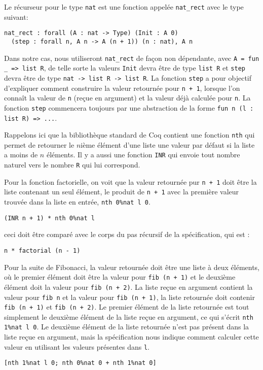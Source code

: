 \documentclass[draft]{jflart}
\begin{document}
Le récurseur pour le type \texttt{nat} est une fonction appelée
\texttt{nat\_rect} avec le type suivant:
\begin{verbatim}
nat_rect : forall (A : nat -> Type) (Init : A 0)
  (step : forall n, A n -> A (n + 1)) (n : nat), A n
\end{verbatim}
Dans notre cas, nous utiliseront \texttt{nat\_rect} de façon non
dépendante, avec \texttt{A = fun \_ => list R}, de telle sorte la
valeurs \texttt{Init} devra être de type \texttt{list R} et \texttt{step} devra
être de type \texttt{nat -> list R -> list R}.  La fonction \texttt{step} a
pour objectif d'expliquer comment construire la valeur retournée pour
\texttt{n + 1}, lorsque l'on connaît la valeur de \texttt{n} (reçue en argument)
et la valeur déjà calculée pour \texttt{n}.  La fonction \texttt{step} commencera
toujours par une abstraction de la forme \texttt{fun n (l : list R) => ...}.

Rappelons ici que la bibliothèque standard de Coq contient une
fonction \texttt{nth} qui permet de retourner le \(n\)ième élément d'une
liste une valeur par défaut si la liste a moins de \(n\) éléments.  Il
y a aussi une fonction \texttt{INR} qui envoie tout nombre naturel vers
le nombre \texttt{R} qui lui correspond.

Pour la fonction factorielle, on voit que la valeur retournée pur
\texttt{n + 1} doit être la liste contenant un seul élément,
le produit de \texttt{n + 1} avec
la première valeur trouvée dans la liste en entrée, \texttt{nth 0\%nat l 0}.
\begin{verbatim}
(INR n + 1) * nth 0%nat l
\end{verbatim}
ceci doit être comparé avec le corps du pas récursif de la
spécification, qui est :
\begin{verbatim}
n * factorial (n - 1)
\end{verbatim}

Pour la suite de Fibonacci, la valeur retournée doit être une liste à
deux éléments, où le premier élément doit être la valeur pour \texttt{fib
  (n + 1)} et le deuxième élément doit la valeur pour \texttt{fib (n +
    2)}.  La liste reçue en argument contient la valeur pour \texttt{fib
    n} et la valeur pour \texttt{fib (n + 1)}, la liste retournée doit
contenir \texttt{fib (n + 1)} et \texttt{fib (n + 2)}.  Le premier
élément de la liste retournée est tout simplement le deuxième élément
de la liste reçue en argument, ce qui s'écrit \texttt{nth 1\%nat l 0}.
Le deuxième élément de la liste retournée n'est pas présent dans la
liste reçue en argument, mais la spécification nous indique comment
calculer cette valeur en utilisant les valeurs présentes dans \texttt{l}.
\begin{verbatim}
[nth 1%nat l 0; nth 0%nat 0 + nth 1%nat 0]
\end{verbatim}
\end{document}

